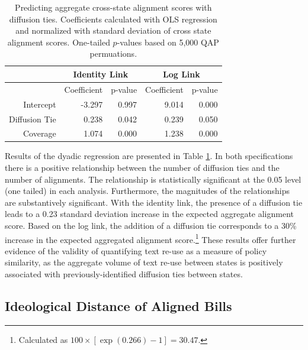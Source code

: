 \documentclass[12pt]{article} %
\begin{document}
\begin{table}[ht]
\centering
\begin{tabular}{rrrrr}
\hline
& \multicolumn{2}{c}{Identity Link} & \multicolumn{2}{c}{Log Link} \\
  \hline
    & Coefficient & p-value & Coefficient & p-value \\
    Intercept & -3.297 & 0.997 & 9.014 & 0.000 \\ 
    Diffusion Tie & 0.238 & 0.042 & 0.239 & 0.050 \\ 
    Coverage & 1.074 & 0.000 & 1.238 & 0.000 \\ 
\hline
\end{tabular}
\caption{Predicting aggregate cross-state alignment scores with diffusion ties.
Coefficients calculated with OLS regression and normalized with standard
deviation of cross state alignment scores. One-tailed $p$-values based on 5,000 QAP permuations.}
\label{tab:qap.diffusion}
\end{table}

Results of the dyadic regression are presented in Table \ref{tab:qap.diffusion}. In both specifications there is a positive relationship between the number of diffusion ties and the number of alignments. The relationship is statistically significant at the 0.05 level (one tailed) in each analysis. Furthermore, the magnitudes of the relationships are substantively significant. With the identity link, the presence of a diffusion tie leads to a 0.23 standard deviation increase in the expected aggregate alignment score. Based on the log link, the addition of a diffusion tie corresponds to a 30\% increase in the expected aggregated alignment score.\footnote{Calculated as $100\times \left[ \exp(0.266)-1\right] = 30.47$.} These results offer further evidence of the validity of quantifying text re-use as a measure of policy similarity, as the aggregate volume of text re-use between states is positively associated with previously-identified diffusion ties between states.


\subsection{Ideological Distance of Aligned Bills}
\end{document}

